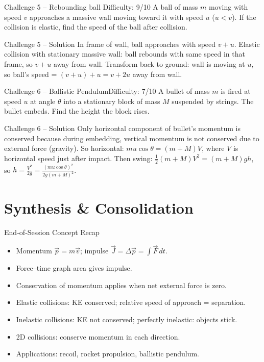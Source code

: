 \documentclass[11pt]{beamer}
\begin{document}
\begin{frame}[shrink=15]{Challenge 5 – Rebounding ball \hfill Difficulty: 9/10}
A ball of mass $m$ moving with speed $v$ approaches a massive wall moving toward it with speed $u$ ($u < v$). If the collision is elastic, find the speed of the ball after collision.
\end{frame}

\begin{frame}{Challenge 5 – Solution}
In frame of wall, ball approaches with speed $v+u$. Elastic collision with stationary massive wall: ball rebounds with same speed in that frame, so $v+u$ away from wall. Transform back to ground: wall is moving at $u$, so ball's speed = $(v+u) + u = v + 2u$ away from wall.
\end{frame}

\begin{frame}[shrink=15]{Challenge 6 – Ballistic Pendulum\hfill Difficulty: 7/10}
A bullet of mass $m$ is fired at speed $u$ at angle $\theta$ into a stationary block of mass $M$ suspended by strings. The bullet embeds. Find the height the block rises.
\end{frame}

\begin{frame}{Challenge 6 – Solution}
Only horizontal component of bullet's momentum is conserved because during embedding, vertical momentum is not conserved due to external force (gravity). So horizontal: $m u\cos\theta = (m+M) V$, where $V$ is horizontal speed just after impact. Then swing: $\frac12 (m+M) V^2 = (m+M) g h$, so $h = \frac{V^2}{2g} = \frac{(m u\cos\theta)^2}{2g (m+M)^2}$.
\end{frame}

\section{Synthesis \& Consolidation}

\begin{frame}{End‑of‑Session Concept Recap}
\begin{itemize}
    \item Momentum $\vec{p} = m\vec{v}$; impulse $\vec{J} = \Delta\vec{p} = \int \vec{F}\,dt$.
    \item Force–time graph area gives impulse.
    \item Conservation of momentum applies when net external force is zero.
    \item Elastic collisions: KE conserved; relative speed of approach = separation.
    \item Inelastic collisions: KE not conserved; perfectly inelastic: objects stick.
    \item 2D collisions: conserve momentum in each direction.
    \item Applications: recoil, rocket propulsion, ballistic pendulum.
\end{itemize}
\end{frame}
\end{document}
